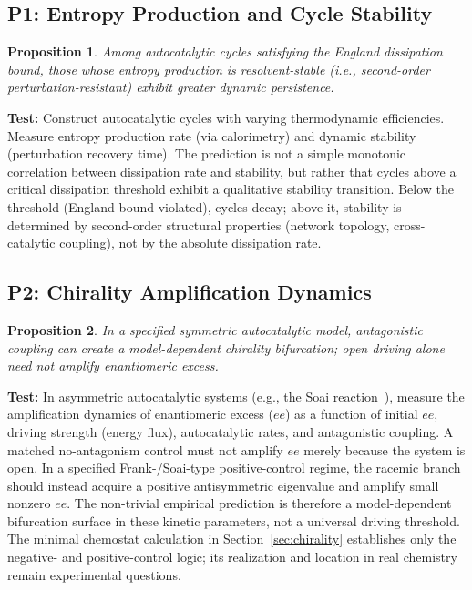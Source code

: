 \documentclass[12pt,a4paper]{article}
\newtheorem{proposition}{Proposition}
\theoremstyle{remark}
\begin{document}
\subsection{P1: Entropy Production and Cycle Stability}

\begin{proposition}
Among autocatalytic cycles satisfying the England dissipation bound, those whose entropy production is resolvent-stable (i.e., second-order perturbation-resistant) exhibit greater dynamic persistence.
\end{proposition}

\textbf{Test:} Construct autocatalytic cycles with varying thermodynamic efficiencies. Measure entropy production rate (via calorimetry) and dynamic stability (perturbation recovery time). The prediction is not a simple monotonic correlation between dissipation rate and stability, but rather that cycles above a critical dissipation threshold exhibit a qualitative stability transition. Below the threshold (England bound violated), cycles decay; above it, stability is determined by second-order structural properties (network topology, cross-catalytic coupling), not by the absolute dissipation rate.

\subsection{P2: Chirality Amplification Dynamics}

\begin{proposition}
In a specified symmetric autocatalytic model, antagonistic coupling can create a model-dependent chirality bifurcation; open driving alone need not amplify enantiomeric excess.
\end{proposition}

\textbf{Test:} In asymmetric autocatalytic systems (e.g., the Soai reaction~\citep{Soai1995}), measure the amplification dynamics of enantiomeric excess ($ee$) as a function of initial $ee$, driving strength (energy flux), autocatalytic rates, and antagonistic coupling. A matched no-antagonism control must not amplify $ee$ merely because the system is open. In a specified Frank-/Soai-type positive-control regime, the racemic branch should instead acquire a positive antisymmetric eigenvalue and amplify small nonzero $ee$. The non-trivial empirical prediction is therefore a model-dependent bifurcation surface in these kinetic parameters, not a universal driving threshold. The minimal chemostat calculation in Section~\ref{sec:chirality} establishes only the negative- and positive-control logic; its realization and location in real chemistry remain experimental questions.
\end{document}
